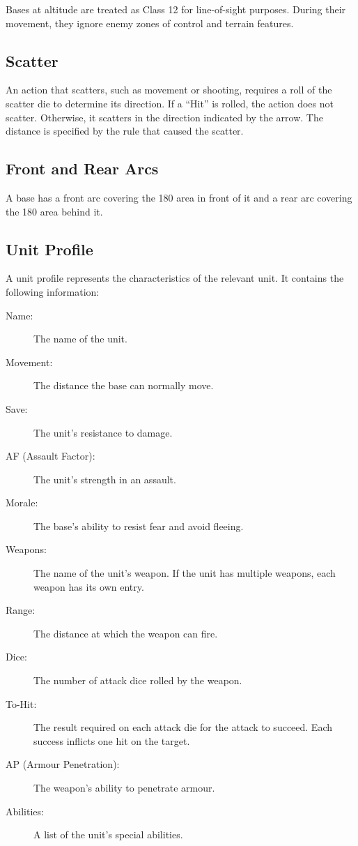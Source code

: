 Bases at altitude are treated as Class 12 for line-of-sight purposes. During their movement, they ignore enemy zones of control and terrain features.

\subsection{Scatter}

An action that scatters, such as movement or shooting, requires a roll of the scatter die to determine its direction. If a ``Hit'' is rolled, the action does not scatter. Otherwise, it scatters in the direction indicated by the arrow. The distance is specified by the rule that caused the scatter.

\subsection{Front and Rear Arcs}

A base has a front arc covering the 180\textdegree{} area in front of it and a rear arc covering the 180\textdegree{} area behind it.

\subsection{Unit Profile}

A unit profile represents the characteristics of the relevant unit. It contains the following information:

\begin{description}
    \item[Name:] The name of the unit.

    \item[Movement:] The distance the base can normally move.

    \item[Save:] The unit's resistance to damage.

    \item[AF (Assault Factor):] The unit's strength in an assault.

    \item[Morale:] The base's ability to resist fear and avoid fleeing.

    \item[Weapons:] The name of the unit's weapon. If the unit has multiple weapons, each weapon has its own entry.

    \item[Range:] The distance at which the weapon can fire.

    \item[Dice:] The number of attack dice rolled by the weapon.

    \item[To-Hit:] The result required on each attack die for the attack to succeed. Each success inflicts one hit on the target.

    \item[AP (Armour Penetration):] The weapon's ability to penetrate armour.

    \item[Abilities:] A list of the unit's special abilities.
\end{description}

